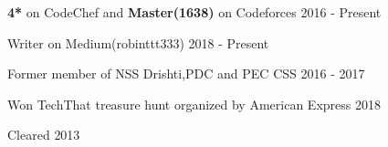 


\begin{cvhonors}

\cvhonor
{} %
{\textbf{4*} on CodeChef and \textbf{Master(1638)} on Codeforces} %
{} %
{2016 - Present} %

\cvhonor
{} %
{Writer on Medium(robinttt333)} %
{} %
{2018 - Present} %

\cvhonor
{} %
{Former member of NSS Drishti,PDC and PEC CSS} %
{} %
{2016 - 2017} %

\cvhonor
{} %
{Won TechThat treasure hunt organized by American Express } %
{} %
{2018} %
    
\cvhonor
{} %
{Cleared } %
{} %
{2013} %
    

\end{cvhonors}